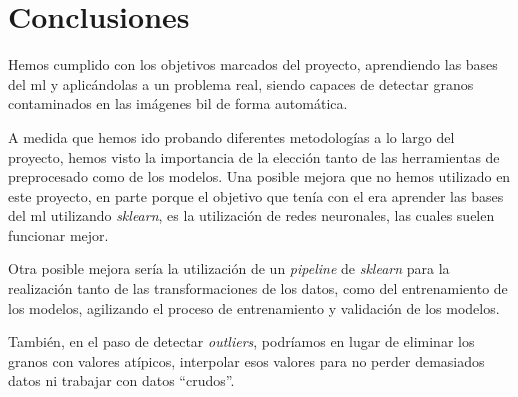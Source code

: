 \section{Conclusiones}

Hemos cumplido con los objetivos marcados del proyecto, aprendiendo las bases del \gls{ml} y aplicándolas a un problema real, siendo capaces de detectar granos contaminados en las imágenes \gls{bil} de forma automática.

A medida que hemos ido probando diferentes metodologías a lo largo del proyecto, hemos visto la importancia de la elección tanto de las herramientas de preprocesado como de los modelos.
Una posible mejora que no hemos utilizado en este proyecto, en parte porque el objetivo que tenía con el era aprender las bases del \gls{ml} utilizando \textit{sklearn}, es la utilización de redes neuronales, las cuales suelen funcionar mejor.

Otra posible mejora sería la utilización de un \textit{pipeline} de \textit{sklearn} para la realización tanto de las transformaciones de los datos, como del entrenamiento de los modelos, agilizando el proceso de entrenamiento y validación de los modelos. 

También, en el paso de detectar \textit{outliers}, podríamos en lugar de eliminar los granos con valores atípicos, interpolar esos valores para no perder demasiados datos ni trabajar con datos ``crudos''.